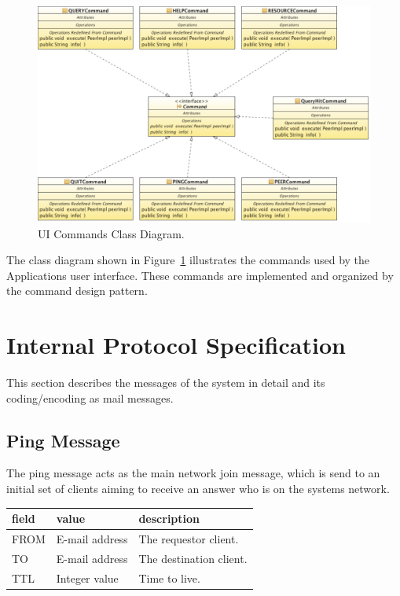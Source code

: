 \documentclass{article}
\begin{document}
\begin{figure}[!hbtp]
\centering
\includegraphics[width=\textwidth]{../img/CommandsClassDiagram.pdf}
\caption{UI Commands Class Diagram.}
\label{fig:commandsclassdia}
\end{figure}
The class diagram shown in Figure~\ref{fig:commandsclassdia} illustrates the
commands used by the Applications user interface. These commands are
implemented and organized by the command design pattern.


\section{Internal Protocol Specification}

This section describes the messages of the system in detail and its
coding/encoding as mail messages.

\subsection{Ping Message}
The ping message acts as the main network join message, which is send to
an initial set of clients aiming to receive an answer who is on the systems
network.
\newline
\noindent
\begin{tabular}{|lll|} 
\hline
field & value & description \\
\hline 
FROM & E-mail address & The requestor client. \\
TO & E-mail address & The destination client. \\
TTL & Integer value & Time to live. \\
\hline 
\end{tabular}
\end{document}

